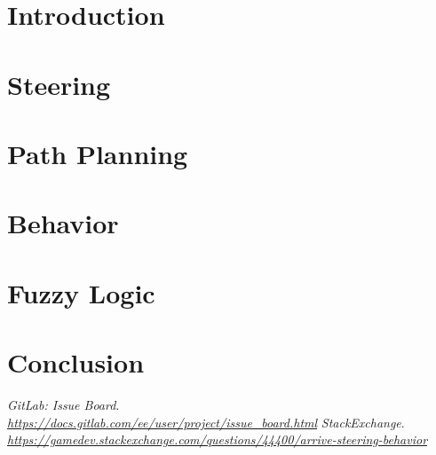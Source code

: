 \documentclass[12pt, a4paper]{article}
\begin{document}
	\section{Introduction}\label{sec:intro}
	
	\newpage
	\section{Steering}\label{sec:steering}
	
	\newpage
	\section{Path Planning}
	
	\newpage
	\section{Behavior}
	
	\newpage
	\section{Fuzzy Logic}
	
	\newpage
	\section{Conclusion}\label{sec:planning}
	
	\newpage
	\appendix
	\begin{thebibliography}{9}
	  	\textit{GitLab: Issue Board}.
	  		\\\textit{\url{https://docs.gitlab.com/ee/user/project/issue_board.html}}
	  \textit{StackExchange}.
	  \\\textit{\url{https://gamedev.stackexchange.com/questions/44400/arrive-steering-behavior}}
	\end{thebibliography}
\end{document}
